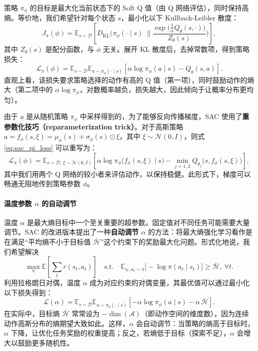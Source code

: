 策略 $\pi_\phi$ 的目标是最大化当前状态下的 Soft Q 值（由 Q 网络评估），同时保持高熵。等价地，我们希望针对每个状态 $s$，最小化以下 Kullback-Leibler 散度：
\begin{equation}
J_\pi(\phi) = \mathbb{E}_{s \sim \mathcal{D}} \left[ D_{\text{KL}} \Big( \pi_\phi(\cdot \mid s) \;\Big\| \frac{\exp\big( \frac{1}{\alpha} Q_\theta(s, \cdot) \big)}{Z_\theta(s)} \Big) \right],
\label{eq:sac_policy_kl}
\end{equation}
其中 $Z_\theta(s)$ 是配分函数，与 $\phi$ 无关。展开 KL 散度后，去掉常数项，得到策略损失：
\begin{equation}
\mathcal{L}_\pi(\phi) = \mathbb{E}_{s \sim \mathcal{D}} \mathbb{E}_{a \sim \pi_\phi(\cdot \mid s)} \left[ \alpha \log \pi_\phi(a \mid s) - Q_\theta(s, a) \right].
\label{eq:sac_pi_loss}
\end{equation}
直观上看，该损失要求策略选择的动作有高的 Q 值（第一项），同时鼓励动作的熵大（第二项中的 $\alpha \log \pi_\phi$，对数概率越负，损失越大，因此倾向于让概率分布更均匀）。

由于 $a$ 是从随机策略 $\pi_\phi$ 中采样得到的，为了能够反向传播梯度，SAC 使用了\textbf{重参数化技巧（reparameterization trick）}。对于高斯策略 $a = f_\phi(s, \xi) = \mu_\phi(s) + \sigma_\phi(s) \odot \xi$，其中 $\xi \sim \mathcal{N}(0, I)$，则式 \eqref{eq:sac_pi_loss} 可以重写为：
\begin{equation}
\mathcal{L}_\pi(\phi) = \mathbb{E}_{s \sim \mathcal{D},\,\xi \sim \mathcal{N}(0,I)} \left[ \alpha \log \pi_\phi\big(f_\phi(s, \xi) \mid s\big) - \min_{j=1,2} Q_{\theta_j}\big(s, f_\phi(s, \xi)\big) \right],
\label{eq:sac_pi_loss_reparam}
\end{equation}
其中我们用两个 Q 网络的较小者来评估动作，以保持稳健。此形式下，梯度可以畅通无阻地传到策略参数 $\phi$。

\paragraph{温度参数 $\alpha$ 的自动调节}

温度 $\alpha$ 是最大熵目标中一个至关重要的超参数。固定值对不同任务可能需要大量调节。SAC 的改进版本提出了一种\textbf{自动调节 $\alpha$} 的方法：将最大熵强化学习看作是在满足“平均熵不小于目标值 $\bar{\mathcal{H}}$”这个约束下的奖励最大化问题。形式化地说，我们希望解决
\begin{equation}
\max_\pi \mathbb{E} \left[ \sum_t r(s_t, a_t) \right] \quad \text{s.t.} \quad \mathbb{E}_{s_t, a_t \sim \pi} \big[ -\log \pi(a_t \mid s_t) \big] \ge \bar{\mathcal{H}},\ \forall t.
\end{equation}
利用拉格朗日对偶，温度 $\alpha$ 成为对应约束的对偶变量，其最优值可以通过最小化以下损失得到：
\begin{equation}
\mathcal{L}(\alpha) = \mathbb{E}_{s \sim \mathcal{D}} \mathbb{E}_{a \sim \pi_\phi(\cdot \mid s)} \left[ -\alpha \log \pi_\phi(a \mid s) - \alpha\, \bar{\mathcal{H}} \right].
\label{eq:sac_alpha_loss}
\end{equation}
在实际中，目标熵 $\bar{\mathcal{H}}$ 常常设为 $- \dim(\mathcal{A})$（即动作空间的维度数），因为连续动作高斯分布的熵期望大致如此。这样，$\alpha$ 会自动调节：当策略的熵高于目标时，$\alpha$ 下降，让优化任务奖励的权重提高；反之，若熵低于目标（探索不足），$\alpha$ 会增大以鼓励更多随机性。

